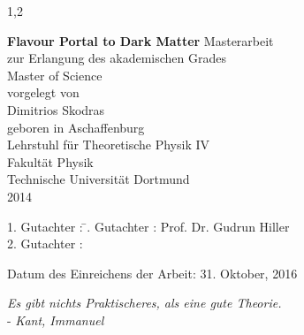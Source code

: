 \documentclass[11pt,a4paper,twoside]{article}
\begin{document}
\begin{spacing}{1,2}

%
%


\newcommand{\thetitle}{Flavour Portal to Dark Matter}

\thispagestyle{empty}
\begin{center}

\Huge\textbf{\thetitle}
\vfill
\vfill
\Large
Masterarbeit\\ zur Erlangung des akademischen Grades \\ Master of Science \\
\vspace{20pt}
\normalsize
vorgelegt von \\[5pt]
{\Large Dimitrios Skodras} \\[5pt]
geboren in Aschaffenburg \\
\vspace{20pt}
Lehrstuhl für Theoretische Physik IV \\ Fakultät Physik \\
Technische Universität Dortmund \\ 2014
\end{center}
\newpage

\thispagestyle{empty}
\vspace*{\fill}
\begin{tabbing}
1. Gutachter : \=. Gutachter : \>Prof. Dr. Gudrun Hiller \\[11pt]
2. Gutachter : \> \\[11pt]
\end{tabbing}
\vspace{11pt}
Datum des Einreichens der Arbeit: 31. Oktober, 2016
\newpage
\thispagestyle{empty}
\begin{flushright} 
\textit{\glqq Es gibt nichts Praktischeres, als eine gute Theorie.\grqq}\\
- \textit{Kant, Immanuel}\\
\vspace{2cm}
\end{flushright}


\end{spacing}
\end{document}
